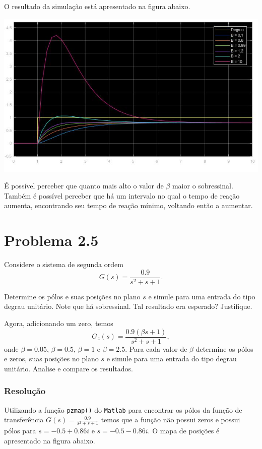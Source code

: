 \documentclass[
]{book}
\theoremstyle{definition}
\theoremstyle{definition}
\theoremstyle{definition}
\theoremstyle{remark}
\begin{document}
O resultado da simulação está apresentado na figura abaixo.

\includegraphics{Imagens/Lab2/prob4SimResult.jpg}

É possível perceber que quanto mais alto o valor de \(\beta\) maior o sobressinal. Também é possível perceber que há um intervalo no qual o tempo de reação aumenta, encontrando seu tempo de reação mínimo, voltando então a aumentar.

\hypertarget{problema-2.5}{%
\section*{Problema 2.5}\label{problema-2.5}}

Considere o sistema de segunda ordem
\[
G(s) = \frac {0.9}{s^2+s+1}.
\]

Determine os pólos e suas posições no plano \(s\) e simule para uma entrada do tipo degrau unitário. Note que há sobressinal. Tal resultado era esperado? Justifique.

Agora, adicionando um zero, temos
\[
G_z(s) = \frac {0.9(\beta s+1)}{s^2+s+1},
\]
onde \(\beta = 0.05\), \(\beta = 0.5\), \(\beta = 1\) e \(\beta = 2.5\). Para cada valor de \(\beta\) determine os pólos e zeros, suas posições no plano \(s\) e simule para uma entrada do tipo degrau unitário. Analise e compare os resultados.

\hypertarget{resoluuxe7uxe3o-4}{%
\subsubsection*{Resolução}\label{resoluuxe7uxe3o-4}}

Utilizando a função \texttt{pzmap()} do \texttt{Matlab} para encontrar os pólos da função de transferência \(G(s) = \frac {0.9}{s^2+s+1}\) temos que a função não possui zeros e possui pólos para \(s = -0.5 + 0.86i\) e \(s = -0.5 -0.86i\). O mapa de posições é apresentado na figura abaixo.
\end{document}
